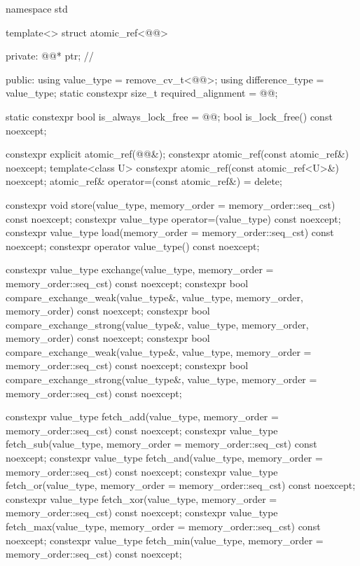 \begin{codeblock}
namespace std {
  template<> struct atomic_ref<@@> {
  private:
    @@* ptr;         // \expos

  public:
    using value_type = remove_cv_t<@@>;
    using difference_type = value_type;
    static constexpr size_t required_alignment = @@;

    static constexpr bool is_always_lock_free = @@;
    bool is_lock_free() const noexcept;

    constexpr explicit atomic_ref(@@&);
    constexpr atomic_ref(const atomic_ref&) noexcept;
    template<class U>
      constexpr atomic_ref(const atomic_ref<U>&) noexcept;
    atomic_ref& operator=(const atomic_ref&) = delete;

    constexpr void store(value_type, memory_order = memory_order::seq_cst) const noexcept;
    constexpr value_type operator=(value_type) const noexcept;
    constexpr value_type load(memory_order = memory_order::seq_cst) const noexcept;
    constexpr operator value_type() const noexcept;

    constexpr value_type exchange(value_type,
                                  memory_order = memory_order::seq_cst) const noexcept;
    constexpr bool compare_exchange_weak(value_type&, value_type,
                                         memory_order, memory_order) const noexcept;
    constexpr bool compare_exchange_strong(value_type&, value_type,
                                           memory_order, memory_order) const noexcept;
    constexpr bool compare_exchange_weak(value_type&, value_type,
                                         memory_order = memory_order::seq_cst) const noexcept;
    constexpr bool compare_exchange_strong(value_type&, value_type,
                                           memory_order = memory_order::seq_cst) const noexcept;

    constexpr value_type fetch_add(value_type,
                                   memory_order = memory_order::seq_cst) const noexcept;
    constexpr value_type fetch_sub(value_type,
                                   memory_order = memory_order::seq_cst) const noexcept;
    constexpr value_type fetch_and(value_type,
                                   memory_order = memory_order::seq_cst) const noexcept;
    constexpr value_type fetch_or(value_type,
                                  memory_order = memory_order::seq_cst) const noexcept;
    constexpr value_type fetch_xor(value_type,
                                   memory_order = memory_order::seq_cst) const noexcept;
    constexpr value_type fetch_max(value_type,
                                   memory_order = memory_order::seq_cst) const noexcept;
    constexpr value_type fetch_min(value_type,
                                   memory_order = memory_order::seq_cst) const noexcept;

}}
\end{codeblock}
